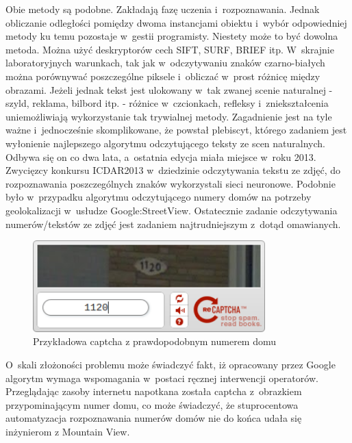 Obie metody są podobne. Zakładają fazę uczenia i~rozpoznawania.
Jednak obliczanie odległości pomiędzy dwoma instancjami obiektu
i~wybór odpowiedniej metody ku temu pozostaje w~gestii programisty.
Niestety może to być dowolna metoda. Można użyć deskryptorów cech
SIFT, SURF, BRIEF itp. W~skrajnie laboratoryjnych warunkach, tak
jak w~odczytywaniu znaków czarno-białych można porównywać poszczególne
piksele i~obliczać w~prost różnicę między obrazami. Jeżeli jednak tekst
jest ulokowany w~tak zwanej scenie naturalnej -
szyld, reklama, bilbord itp. - różnice w~czcionkach, refleksy
i~zniekształcenia uniemożliwiają wykorzystanie tak trywialnej metody.
Zagadnienie jest na tyle ważne i~jednocześnie skomplikowane, że
powstał plebiscyt, którego zadaniem jest wyłonienie najlepszego
algorytmu odczytującego teksty ze scen naturalnych. Odbywa się
on co dwa lata, a~ostatnia edycja miała miejsce w~roku 2013.
Zwycięzcy konkursu ICDAR2013 w~dziedzinie odczytywania tekstu ze
zdjęć, do rozpoznawania poszczególnych znaków wykorzystali sieci neuronowe.
Podobnie było w~przypadku algorytmu odczytującego numery domów na potrzeby
geolokalizacji w~usłudze Google:StreetView. Ostatecznie zadanie
odczytywania numerów/tekstów ze zdjęć jest zadaniem najtrudniejszym
z~dotąd omawianych.

\begin{figure}[h!]
    \centering
    \includegraphics[width=0.8\textwidth]{img/rev_captcha_street_view}
    \caption{Przykładowa captcha z prawdopodobnym numerem domu}
\end{figure}

O~skali złożoności problemu może świadczyć fakt, iż
opracowany przez Google algorytm wymaga wspomagania w~postaci
ręcznej interwencji
operatorów. Przeglądając zasoby internetu napotkana została captcha
z~obrazkiem przypominającym numer domu, co może świadczyć, że stuprocentowa
automatyzacja rozpoznawania numerów domów nie do końca udała się inżynierom
z Mountain View.

